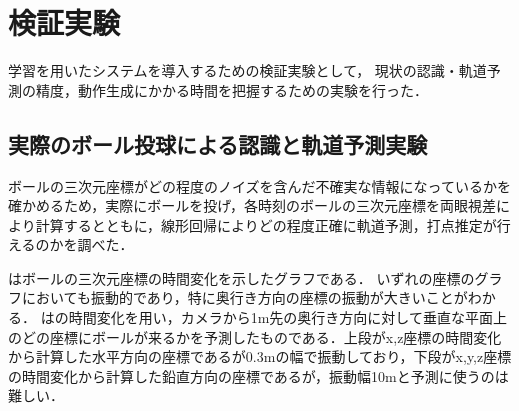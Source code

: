\documentclass[twocolumn]{preport}
\begin{document}
\section{検証実験}
学習を用いたシステムを導入するための検証実験として，
現状の認識・軌道予測の精度，動作生成にかかる時間を把握するための実験を行った．

\subsection{実際のボール投球による認識と軌道予測実験}
ボールの三次元座標がどの程度のノイズを含んだ不確実な情報になっているかを確かめるため，実際にボールを投げ，各時刻のボールの三次元座標を両眼視差により計算するとともに，線形回帰によりどの程度正確に軌道予測，打点推定が行えるのかを調べた．

はボールの三次元座標の時間変化を示したグラフである．
いずれの座標のグラフにおいても振動的であり，特に奥行き方向の座標の振動が大きいことがわかる．
はの時間変化を用い，カメラから1m先の奥行き方向に対して垂直な平面上のどの座標にボールが来るかを予測したものである．上段がx,z座標の時間変化から計算した水平方向の座標であるが0.3mの幅で振動しており，下段がx,y,z座標の時間変化から計算した鉛直方向の座標であるが，振動幅10mと予測に使うのは難しい．
\end{document}
